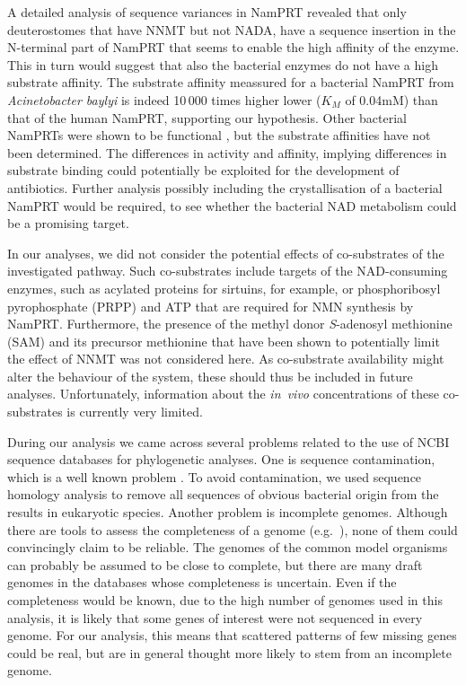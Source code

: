 A detailed analysis of sequence variances in NamPRT revealed that only deuterostomes that have NNMT but not NADA, have a sequence insertion in the N-terminal part of NamPRT that seems to enable the high affinity of the enzyme. This in turn would suggest that also the bacterial enzymes do not have a high substrate affinity. The substrate affinity meassured for a bacterial NamPRT from \textit{Acinetobacter baylyi} \cite{Sorci2010} is indeed 10\,000 times higher lower ($K_{M}$ of 0.04mM) than that of the human NamPRT, supporting our hypothesis. Other bacterial NamPRTs were shown to be functional \cite{Martin2001,Gerdes2006}, but the substrate affinities have not been determined. The differences in activity and affinity, implying differences in substrate binding could potentially be exploited for the development of antibiotics. Further analysis possibly including the crystallisation of a bacterial NamPRT would be required, to see whether the bacterial NAD metabolism could be a promising target.


In our analyses, we did not consider the potential effects of co-substrates of the investigated pathway. Such co-substrates include targets of the NAD-consuming enzymes, such as acylated proteins for sirtuins, for example, or phosphoribosyl pyrophosphate (PRPP) and ATP that are required for NMN synthesis by NamPRT. Furthermore, the presence of the methyl donor \textit{S}-adenosyl methionine (SAM) and its precursor methionine that have been shown to potentially limit the effect of NNMT \cite{Ulanovskaya2013} was not considered here. As co-substrate availability might alter the behaviour of the system, these should thus be included in future analyses. Unfortunately, information about the \textit{in~vivo} concentrations of these co-substrates is currently very limited.

During our analysis we came across several problems related to the use of NCBI sequence databases for phylogenetic analyses. One is sequence contamination, which is a well known problem \cite{Ballenghien2017,Longo2011}. To avoid contamination, we used sequence homology analysis to remove all sequences of obvious bacterial origin from the results in eukaryotic species. Another problem is incomplete genomes. Although there are tools to assess the completeness of a genome (e.g.~\cite{Simao2015}), none of them could convincingly claim to be reliable. The genomes of the common model organisms can probably be assumed to be close to complete, but there are many draft genomes in the databases whose completeness is uncertain. Even if the completeness would be known, due to the high number of genomes used in this analysis, it is likely that some genes of interest were not sequenced in every genome. For our analysis, this means that scattered patterns of few missing genes could be real, but are in general thought more likely to stem from an incomplete genome.

